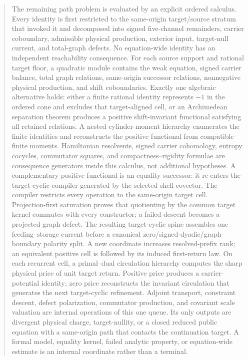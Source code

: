 \documentclass[11pt]{article}
\numberwithin{section}{part}
\theoremstyle{plain}
\theoremstyle{definition}
\theoremstyle{remark}
\begin{document}
\begin{abstract}
The remaining path problem is evaluated by an explicit ordered calculus.
Every identity is first restricted to the same-origin target/source stratum
that invoked it and decomposed into signed five-channel remainders, carrier
coboundary, admissible physical production, exterior input, target-null
current, and total-graph defects.  No equation-wide identity has an
independent reachability consequence.
For each source support and rational target floor, a quadratic module contains
the weak equation, signed carrier balance, total graph relations, same-origin
successor relations, nonnegative physical production, and shift
coboundaries.  Exactly one algebraic alternative holds: either a finite
rational identity represents \(-1\) in the ordered cone and excludes that
target-aligned cell, or an Archimedean separation theorem produces a positive
shift-invariant functional satisfying all retained relations.  A nested
cylinder-moment hierarchy enumerates the finite identities and reconstructs
the positive functional from compatible finite moments.  Hamiltonian
resolvents, signed carrier cohomology, entropy cocycles, commutator squares,
and compactness--rigidity formulae are consequence generators inside this
calculus, not additional hypotheses.  A complementary positive functional is
an equality successor: it re-enters the target-cyclic compiler generated by
the selected shell covector.  The compiler restricts every operation to the
same-origin target cell.  Projection-first saturation proves that quotienting
by the common target kernel commutes with every constructor; a failed descent
becomes a projected graph defect.  The resulting target-cyclic spine
assembles one feeding--storage current before a
canonical zero/signed-dyadic/graph-boundary polarity split.  A new coordinate
increases resolved-prefix rank; an equivalent positive cell is followed by
its induced first-return law.  On each recurrent cell, a primal--dual
circulation hierarchy computes the sharp physical price of unit target
return.  Positive price produces a carrier-potential identity; zero price
reconstructs the invariant circulation that generates the next target-cyclic
refinement.  Adjoint transport, constraint descent, defect
polarization, commutator production, and covariant scale valuation are
internal operations of this one queue.  Its only outputs are divergent
physical charge, target-nullity, or a closed reduced public equation with a
same-origin path that contacts the continuation target.  A formal model,
equality kernel, failed analytic property, or equation-wide estimate is an
internal coordinate rather than a terminal.
\end{abstract}
\end{document}
